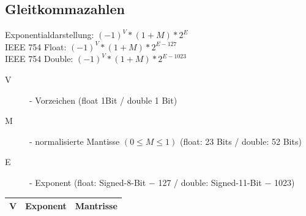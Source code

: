 \documentclass[a4paper,10pt]{article}
\begin{document}
\subsection{Gleitkommazahlen}
Exponentialdarstellung: $(-1)^V * (1+M)*2^E$ \\
IEEE 754 Float: $(-1)^V * (1+M) * 2^{E-127}$ \\
IEEE 754 Double: $(-1)^V * (1+M) * 2^{E-1023}$ \\
\begin{description}
	\item[V] - Vorzeichen (float 1Bit / double 1 Bit)
	\item[M] - normalisierte Mantisse $(0 \leq M \leq 1)$ (float: 23 Bits / double: 52 Bits)
	\item[E] - Exponent (float: Signed-8-Bit $-$ 127  / double: Signed-11-Bit $-$ 1023)
\end{description} 
\begin{tabular}{|c|l|l|}
	\hline
	V & Exponent & Mantrisse \\
	\hline
\end{tabular}
\end{document}
